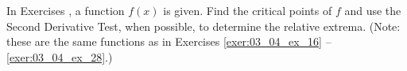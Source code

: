 {\noindent In Exercises}
{, a function $f(x)$ is given. Find the critical points of $f$ and use the Second Derivative Test, when possible, to determine the relative extrema. (Note: these are the same functions as in Exercises \ref{exer:03_04_ex_16}  -- \ref{exer:03_04_ex_28}.)
}
